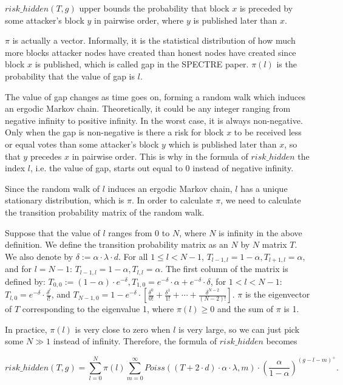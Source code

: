 \documentclass[a4paper,11pt]{article}
\begin{document}
$risk\_hidden(T,g)$ upper bounds the probability that block $x$ is preceded by
some attacker’s block $y$ in pairwise order, where $y$ is published later than
$x$.

$\pi$ is actually a vector. Informally, it is the statistical distribution of
how much more blocks attacker nodes have created than honest nodes have created
since block $x$ is published, which is called gap in the SPECTRE paper. $\pi(l)$
is the probability that the value of gap is $l$.

The value of gap changes as time goes on, forming a random walk which induces an
ergodic Markov chain. Theoretically, it could be any integer ranging from
negative infinity to positive infinity. In the worst case, it is always
non-negative. Only when the gap is non-negative is there a risk for block $x$ to
be received less or equal votes than some attacker’s block $y$ which is
published later than $x$, so that $y$ precedes $x$ in pairwise order. This is
why in the formula of $risk\_hidden$ the index $l$, i.e. the value of gap,
starts out equal to 0 instead of negative infinity.

Since the random walk of $l$ induces an ergodic Markov chain, $l$ has a unique
stationary distribution, which is $\pi$. In order to calculate $\pi$, we need to
calculate the transition probability matrix of the random walk.

Suppose that the value of $l$ ranges from 0 to $N$, where $N$ is infinity in the
above definition. We define the transition probability matrix as an $N$ by $N$
matrix $T$. We also denote by $\delta := \alpha \cdot \lambda \cdot d$. For all
$1 \leq l < N - 1$, $T_{l-1,l} = 1 - \alpha, T_{l+1,l} = \alpha$, and for $l = N
- 1$: $T_{l-1,l} = 1 - \alpha, T_{l,l} = \alpha$. The first column of the matrix
is defined by: $T_{0,0} := (1 - \alpha) \cdot e^{-\delta}, T_{1,0} = e^{-\delta}
\cdot \alpha + e^{-\delta} \cdot \delta$, for $1 < l < N - 1$: $T_{l,0} =
e^{-\delta} \cdot \frac{\delta^l}{l!}$, and $T_{N-1,0} = 1 - e^{-\delta} \cdot
\left[\frac{\delta^0}{0!} + \frac{\delta^1}{1!} + \cdots +
\frac{\delta^{N-2}}{(N-2)!}\right]$.  $\pi$ is the eigenvector of $T$
corresponding to the eigenvalue 1, where $\pi(l) \geq 0$ and the sum of $\pi$ is
1.

In practice, $\pi(l)$ is very close to zero when $l$ is very large, so we can
just pick some $N \gg 1$ instead of infinity. Therefore, the formula of
$risk\_hidden$ becomes

$$
risk\_hidden(T,g) = \sum_{l=0}^{N} \pi(l) \sum_{m=0}^{\infty} Poiss((T + 2 \cdot
d) \cdot \alpha \cdot \lambda, m) \cdot \left(\frac{\alpha}{1-\alpha}\right)^{(g
- l - m)^+}.
$$
\end{document}

